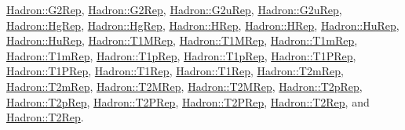 \mbox{\hyperlink{structHadron_1_1G2Rep}{Hadron\+::\+G2\+Rep}}, \mbox{\hyperlink{structHadron_1_1G2Rep}{Hadron\+::\+G2\+Rep}}, \mbox{\hyperlink{structHadron_1_1G2uRep}{Hadron\+::\+G2u\+Rep}}, \mbox{\hyperlink{structHadron_1_1G2uRep}{Hadron\+::\+G2u\+Rep}}, \mbox{\hyperlink{structHadron_1_1HgRep}{Hadron\+::\+Hg\+Rep}}, \mbox{\hyperlink{structHadron_1_1HgRep}{Hadron\+::\+Hg\+Rep}}, \mbox{\hyperlink{structHadron_1_1HRep}{Hadron\+::\+H\+Rep}}, \mbox{\hyperlink{structHadron_1_1HRep}{Hadron\+::\+H\+Rep}}, \mbox{\hyperlink{structHadron_1_1HuRep}{Hadron\+::\+Hu\+Rep}}, \mbox{\hyperlink{structHadron_1_1HuRep}{Hadron\+::\+Hu\+Rep}}, \mbox{\hyperlink{structHadron_1_1T1MRep}{Hadron\+::\+T1\+M\+Rep}}, \mbox{\hyperlink{structHadron_1_1T1MRep}{Hadron\+::\+T1\+M\+Rep}}, \mbox{\hyperlink{structHadron_1_1T1mRep}{Hadron\+::\+T1m\+Rep}}, \mbox{\hyperlink{structHadron_1_1T1mRep}{Hadron\+::\+T1m\+Rep}}, \mbox{\hyperlink{structHadron_1_1T1pRep}{Hadron\+::\+T1p\+Rep}}, \mbox{\hyperlink{structHadron_1_1T1pRep}{Hadron\+::\+T1p\+Rep}}, \mbox{\hyperlink{structHadron_1_1T1PRep}{Hadron\+::\+T1\+P\+Rep}}, \mbox{\hyperlink{structHadron_1_1T1PRep}{Hadron\+::\+T1\+P\+Rep}}, \mbox{\hyperlink{structHadron_1_1T1Rep}{Hadron\+::\+T1\+Rep}}, \mbox{\hyperlink{structHadron_1_1T1Rep}{Hadron\+::\+T1\+Rep}}, \mbox{\hyperlink{structHadron_1_1T2mRep}{Hadron\+::\+T2m\+Rep}}, \mbox{\hyperlink{structHadron_1_1T2mRep}{Hadron\+::\+T2m\+Rep}}, \mbox{\hyperlink{structHadron_1_1T2MRep}{Hadron\+::\+T2\+M\+Rep}}, \mbox{\hyperlink{structHadron_1_1T2MRep}{Hadron\+::\+T2\+M\+Rep}}, \mbox{\hyperlink{structHadron_1_1T2pRep}{Hadron\+::\+T2p\+Rep}}, \mbox{\hyperlink{structHadron_1_1T2pRep}{Hadron\+::\+T2p\+Rep}}, \mbox{\hyperlink{structHadron_1_1T2PRep}{Hadron\+::\+T2\+P\+Rep}}, \mbox{\hyperlink{structHadron_1_1T2PRep}{Hadron\+::\+T2\+P\+Rep}}, \mbox{\hyperlink{structHadron_1_1T2Rep}{Hadron\+::\+T2\+Rep}}, and \mbox{\hyperlink{structHadron_1_1T2Rep}{Hadron\+::\+T2\+Rep}}.


